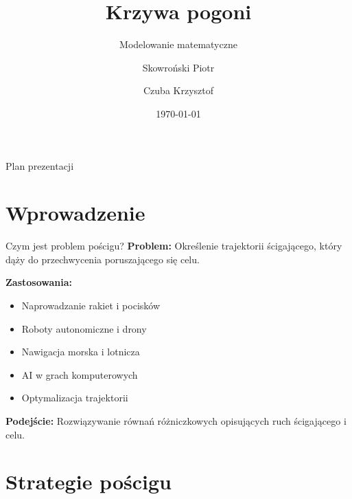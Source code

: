 \documentclass[aspectratio=169,11pt]{beamer}
\title[Krzywa pogoni]{Krzywa pogoni}
\subtitle{Modelowanie matematyczne}
\author{Skowroński Piotr \and Czuba Krzysztof}
\institute{Informatyka, studia II stopnia (sem. II)}
\date{\today}
\begin{document}
\begin{frame}
\titlepage
\end{frame}

\begin{frame}{Plan prezentacji}
\tableofcontents
\end{frame}

\section{Wprowadzenie}

\begin{frame}{Czym jest problem pościgu?}
\textbf{Problem:} Określenie trajektorii ścigającego, który dąży do przechwycenia poruszającego się celu.

\vspace{0.5cm}
\textbf{Zastosowania:}
\begin{itemize}
    \item Naprowadzanie rakiet i pocisków
    \item Roboty autonomiczne i drony
    \item Nawigacja morska i lotnicza
    \item AI w grach komputerowych
    \item Optymalizacja trajektorii
\end{itemize}

\vspace{0.5cm}
\textbf{Podejście:} Rozwiązywanie równań różniczkowych opisujących ruch ścigającego i celu.
\end{frame}

\section{Strategie pościgu}
\end{document}
